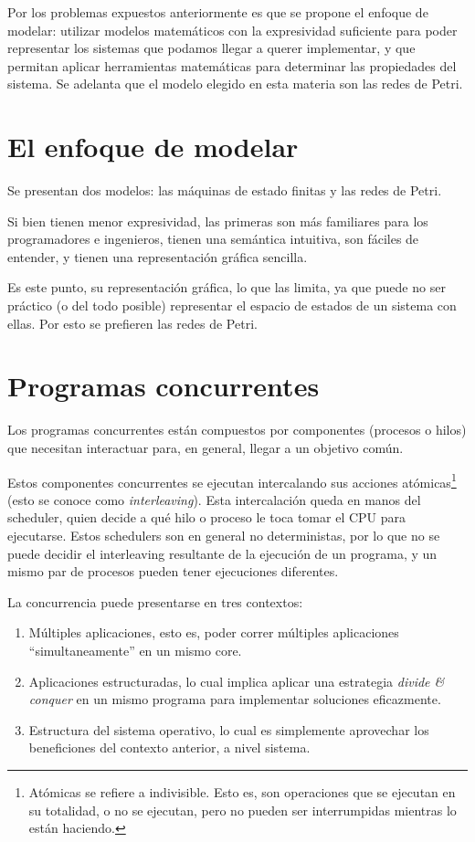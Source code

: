 Por los problemas expuestos anteriormente es que se propone el enfoque de modelar: utilizar modelos matemáticos con la expresividad suficiente para poder representar los sistemas que podamos llegar a querer implementar, y que permitan aplicar herramientas matemáticas para determinar las propiedades del sistema. Se adelanta que el modelo elegido en esta materia son las redes de Petri.

\section{El enfoque de modelar}
Se presentan dos modelos: las máquinas de estado finitas y las redes de Petri.

Si bien tienen menor expresividad, las primeras son más familiares para los programadores e ingenieros, tienen una semántica intuitiva, son fáciles de entender, y tienen una representación gráfica sencilla.

Es este punto, su representación gráfica, lo que las limita, ya que puede no ser práctico (o del todo posible) representar el espacio de estados de un sistema con ellas. Por esto se prefieren las redes de Petri.

\section{Programas concurrentes}
Los programas concurrentes están compuestos por componentes (procesos o hilos) que necesitan interactuar para, en general, llegar a un objetivo común.

Estos componentes concurrentes se ejecutan intercalando sus acciones atómicas\footnote{Atómicas se refiere a indivisible. Esto es, son operaciones que se ejecutan en su totalidad, o no se ejecutan, pero no pueden ser interrumpidas mientras lo están haciendo.} (esto se conoce como \textit{interleaving}). Esta intercalación queda en manos del scheduler, quien decide a qué hilo o proceso le toca tomar el CPU para ejecutarse. Estos schedulers son en general no deterministas, por lo que no se puede decidir el interleaving resultante de la ejecución de un programa, y un mismo par de procesos pueden tener ejecuciones diferentes.

La concurrencia puede presentarse en tres contextos:
\begin{enumerate}
  \item Múltiples aplicaciones, esto es, poder correr múltiples aplicaciones ``simultaneamente'' en un mismo core.
  \item Aplicaciones estructuradas, lo cual implica aplicar una estrategia \textit{divide \& conquer} en un mismo programa para implementar soluciones eficazmente.
  \item Estructura del sistema operativo, lo cual es simplemente aprovechar los beneficiones del contexto anterior, a nivel sistema.
\end{enumerate}

